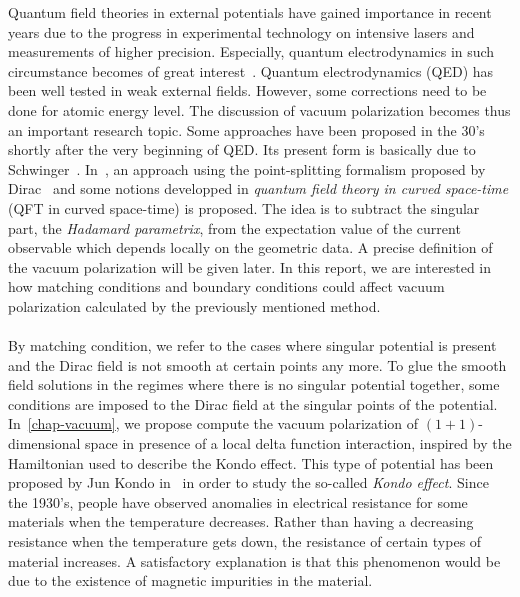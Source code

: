 Quantum field theories in external potentials have gained importance in recent years due to the progress in experimental technology on intensive lasers and measurements of higher precision.
Especially, quantum electrodynamics in such circumstance becomes of great interest~\cite{Mohr1998}. 
Quantum electrodynamics (QED) has been well tested in weak external fields.
However, some corrections need to be done for atomic energy level. 
The discussion of vacuum polarization becomes thus an important research topic. 
Some approaches have been proposed in the 30's shortly after the very beginning of QED.
Its present form is basically due to Schwinger~\cite{Schwinger1951}. 
In~\cite{Zahn2015}, an approach using the point-splitting formalism proposed by Dirac~\cite{Dirac1934} and some notions developped in \textit{quantum field theory in curved space-time} (QFT in curved space-time) is proposed. 
The idea is to subtract the singular part, the \textit{Hadamard parametrix}, from the expectation value of the current observable which depends locally on the geometric data. 
A precise definition of the vacuum polarization will be given later.
In this report, we are interested in how matching conditions and boundary conditions could affect vacuum polarization calculated by the previously mentioned method. \\\\
%
By matching condition, we refer to the cases where singular potential is present and the Dirac field is not smooth at certain points any more. 
To glue the smooth field solutions in the regimes where there is no singular potential together, 
some conditions are imposed to the Dirac field at the singular points of the potential.
In~\cref{chap-vacuum}, we propose compute the vacuum polarization of 
$(1+1)$-dimensional space in presence of a local delta function interaction, inspired by the Hamiltonian used to describe the Kondo effect.
This type of potential has been proposed by Jun Kondo in~\cite{Kondo1964} in order to study the so-called \textit{Kondo effect}.
Since the 1930's, people have observed anomalies in electrical resistance for some materials when the temperature decreases. 
Rather than having a decreasing resistance when the temperature gets down,
the resistance of certain types of material increases. 
A satisfactory explanation is that this phenomenon would be due to the existence of magnetic impurities in the material. 
